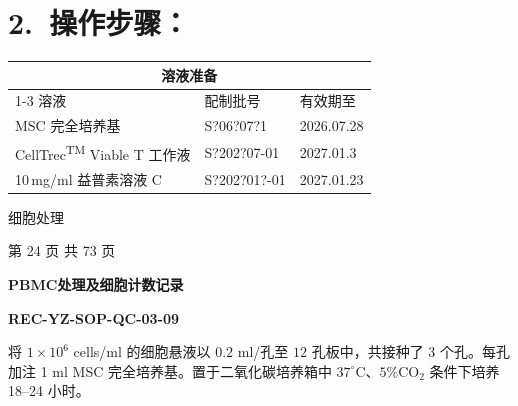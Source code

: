 \documentclass[UTF8,10pt,a4paper,fontset=fandol]{ctexart}
\newcommand{\fieldvalue}[1]{#1}
\newcommand{\handwritten}[1]{#1}
\begin{document}
\section*{2.\ 操作步骤：}

\begin{center}
\begin{tabular}{|p{4.5cm}|p{5.5cm}|p{4.5cm}|}
\hline
\multicolumn{3}{|c|}{溶液准备}\\
\cline{1-3}
溶液 & 配制批号 & 有效期至\\
\hline
MSC 完全培养基 &
\fieldvalue{\handwritten{S?06?07?1}} &
\fieldvalue{\handwritten{2026.07.28}}\\
\hline
CellTrec\textsuperscript{TM} Viable T 工作液 &
\fieldvalue{\handwritten{S?202?07-01}} &
\fieldvalue{\handwritten{2027.01.3}}\\
\hline
10\,mg/ml 益普素溶液 C &
\fieldvalue{\handwritten{S?202?01?-01}} &
\fieldvalue{\handwritten{2027.01.23}}\\
\hline
\end{tabular}
\end{center}

\begin{center}
细胞处理
\end{center}

\begin{center}
第 24 页 共 73 页
\end{center}

\newpage

\begin{center}
\textbf{PBMC处理及细胞计数记录}
\end{center}

\noindent
\textbf{REC-YZ-SOP-QC-03-09}

\noindent
将 $1\times10^{6}$ cells/ml 的细胞悬液以 $0.2$ ml/孔至 $12$ 孔板中，共接种了 3 个孔。每孔加注 1 ml MSC 完全培养基。置于二氧化碳培养箱中 $37^\circ\mathrm{C}$、$5\%\mathrm{CO}_{2}$ 条件下培养 18--24 小时。
\end{document}

